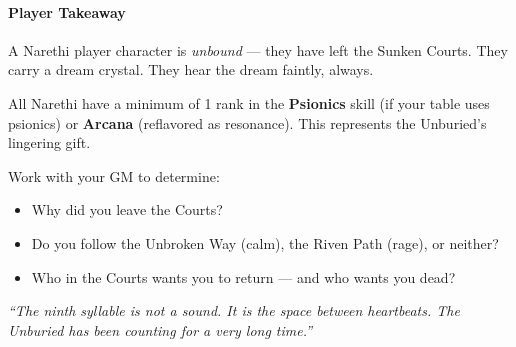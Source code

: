 \paragraph{Player Takeaway}
A Narethi player character is \textit{unbound} --- they have left the Sunken Courts. They carry a dream crystal. They hear the dream faintly, always.

All Narethi have a minimum of 1 rank in the \textbf{Psionics} skill (if your table uses psionics) or \textbf{Arcana} (reflavored as resonance). This represents the Unburied's lingering gift.

Work with your GM to determine:
\begin{itemize}
    \item Why did you leave the Courts?
    \item Do you follow the Unbroken Way (calm), the Riven Path (rage), or neither?
    \item Who in the Courts wants you to return --- and who wants you dead?
\end{itemize}

\noindent \textit{``The ninth syllable is not a sound. It is the space between heartbeats. The Unburied has been counting for a very long time.''}
